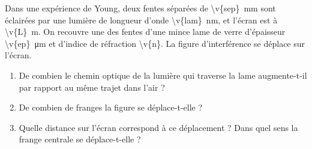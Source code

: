 Dans une expérience de Young, deux fentes séparées de \qty{\v{sep}}{mm} sont éclairées par une lumière de longueur d'onde \qty{\v{lam}}{nm}, et l'écran est à \qty{\v{L}}{m}. On recouvre une des fentes d'une mince lame de verre d'épaisseur \qty{\v{ep}}{\micro\metre} et d'indice de réfraction \num{\v{n}}. La figure d'interférence se déplace sur l'écran.

\begin{enumerate}[label=\alph*)]
    \item De combien le chemin optique de la lumière qui traverse la lame augmente-t-il par rapport au même trajet dans l'air ?
    \item De combien de franges la figure se déplace-t-elle ?
    \item Quelle distance sur l'écran correspond à ce déplacement ? Dans quel sens la frange centrale se déplace-t-elle ?
\end{enumerate}
